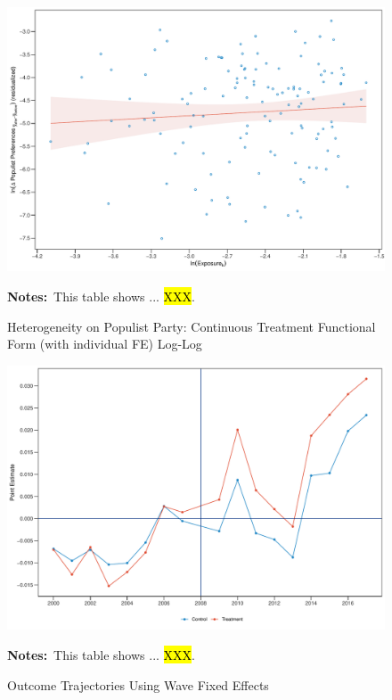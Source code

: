 \documentclass[11pt]{article}
\begin{document}
\begin{figure}[htbp!]
    \centering
    \caption{Heterogeneity on Populist Party: Continuous Treatment Functional Form (with individual FE) Log-Log}\label{fig:pp_functional_form_cbk_past_mean_ife_logs}
    \includegraphics[width=1\linewidth]{heterogeneity/pp_functional_form_cbk_past_mean_ife_logs}
    \begin{tablenotes}
        \footnotesize
        \item \textbf{Notes:}~This table shows ... \hl{XXX}.
    \end{tablenotes} 
\end{figure}


\begin{figure}[htbp!]
    \centering
    \caption{Outcome Trajectories Using Wave Fixed Effects}\label{fig:pp_mean_outcome_cbk_past_mean_p50_sumcoef}
    \includegraphics[width=1\linewidth]{events/pp_mean_outcome_cbk_past_mean_p50_sumcoef}
    \begin{tablenotes}
        \footnotesize
        \item \textbf{Notes:}~This table shows ... \hl{XXX}.
    \end{tablenotes} 
\end{figure}
\end{document}
